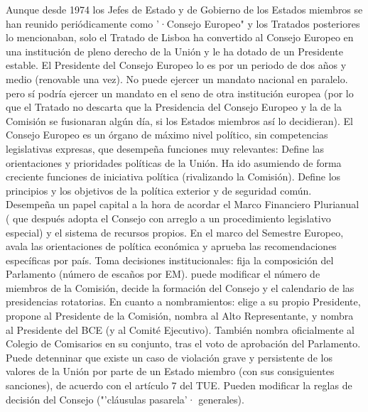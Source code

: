\documentclass[10pt,a4paper]{article}
\begin{document}
Aunque desde 1974 los Jefes de Estado y de Gobierno de los Estados miembros se han reunido
periódicamente como '·Consejo Europeo" y los Tratados posteriores lo mencionaban, solo el
Tratado de Lisboa ha convertido al Consejo Europeo en una institución de pleno derecho de la
Unión y le ha dotado de un Presidente estable. El Presidente del Consejo Europeo lo es por un
periodo de dos años y medio (renovable una vez). No puede ejercer un mandato nacional en
paralelo. pero sí podría ejercer un mandato en el seno de otra institución europea (por lo que el
Tratado no descarta que la Presidencia del Consejo Europeo y la de la Comisión se fusionaran
algún día, si los Estados miembros así lo decidieran). El Consejo Europeo es un órgano de máximo nivel político, sin competencias legislativas expresas, que desempeña funciones muy relevantes:
Define las orientaciones y prioridades políticas de la Unión. Ha ido asumiendo de forma creciente funciones de iniciativa política (rivalizando la Comisión).
Define los principios y los objetivos de la política exterior y de seguridad común. Desempeña un papel capital a la hora de acordar el Marco Financiero Plurianual ( que después adopta el Consejo con arreglo a un procedimiento legislativo especial) y el sistema de recursos propios.
En el marco del Semestre Europeo, avala las orientaciones de política económica y aprueba las recomendaciones específicas por país.
Toma decisiones institucionales: fija la composición del Parlamento (número de escaños por EM). puede modificar el número de miembros de la Comisión, decide la formación del Consejo y el calendario de las presidencias rotatorias.
En cuanto a nombramientos: elige a su propio Presidente, propone al Presidente de la Comisión, nombra al Alto Representante, y nombra al Presidente del BCE (y al Comité Ejecutivo). También nombra oficialmente al Colegio de Comisarios en su conjunto, tras el voto de aprobación del Parlamento. 
Puede detenninar que existe un caso de violación grave y persistente de los valores de la Unión por parte de un Estado miembro (con sus consiguientes sanciones), de acuerdo con el artículo 7 del TUE. Pueden modificar la reglas de decisión del Consejo ("'cláusulas pasarela'· generales). 
\end{document}
